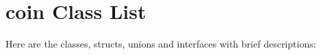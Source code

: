 \section{coin Class List}
Here are the classes, structs, unions and interfaces with brief descriptions:\begin{CompactList}
\item{}
\end{CompactList}
